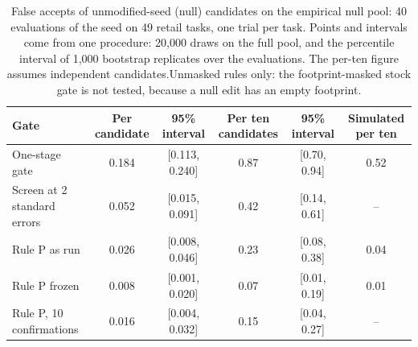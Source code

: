 \begin{table}[t]
\centering\scriptsize
\setlength{\tabcolsep}{3pt}
\caption{False accepts of unmodified-seed (null) candidates on the empirical null pool: 40 evaluations of the seed on 49 retail tasks, one trial per task. Points and intervals come from one procedure: 20,000 draws on the full pool, and the percentile interval of 1,000 bootstrap replicates over the evaluations. The per-ten figure assumes independent candidates.Unmasked rules only: the footprint-masked stock gate is not tested, because a null edit has an empty footprint.}
\label{tab:nullpool}
\begin{tabular}{@{}lccccc@{}}
\toprule
Gate & Per candidate & 95\% interval & Per ten candidates & 95\% interval & Simulated per ten \\
\midrule
One-stage gate & 0.184 & [0.113, 0.240] & 0.87 & [0.70, 0.94] & 0.52 \\
Screen at 2 standard errors & 0.052 & [0.015, 0.091] & 0.42 & [0.14, 0.61] & -- \\
Rule P as run & 0.026 & [0.008, 0.046] & 0.23 & [0.08, 0.38] & 0.04 \\
Rule P frozen & 0.008 & [0.001, 0.020] & 0.07 & [0.01, 0.19] & 0.01 \\
Rule P, 10 confirmations & 0.016 & [0.004, 0.032] & 0.15 & [0.04, 0.27] & -- \\
\bottomrule
\end{tabular}
\end{table}
